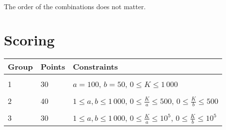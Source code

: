 The order of the combinations does not matter.

\section*{Scoring}
\begin{tabular}{|l|l|l|}
\hline
Group & Points & Constraints \\ \hline
& & \\[-1ex]
1  & 30 & $a = 100$, $b = 50$, $0 \leq K \leq 1\,000$ \\[1ex] \hline
& & \\[-1ex]
2  & 40 & $1 \leq a, b \leq 1\,000$, $0 \leq \frac{K}{a} \leq 500$, $0 \leq \frac{K}{b} \leq 500$ \\[1ex] \hline
& & \\[-1ex]
3  & 30 & $1 \leq a, b \leq 1\,000$, $0 \leq \frac{K}{a} \leq 10^5$, $0 \leq \frac{K}{b} \leq 10^5$ \\[1ex] \hline
\end{tabular}
